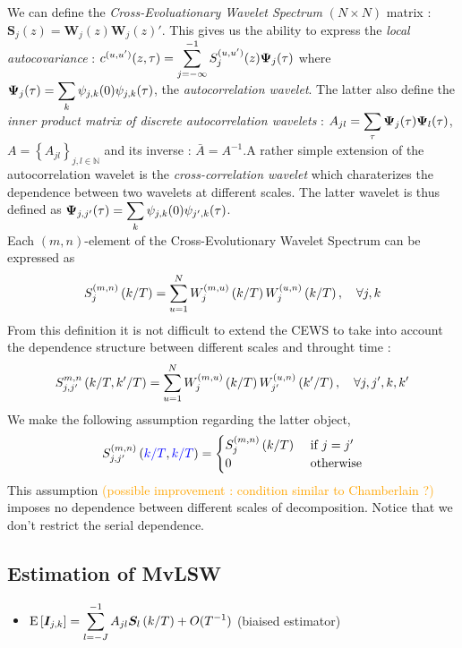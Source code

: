 \documentclass[main_document.tex]{subfiles}
\begin{document}
We can define the \emph{Cross-Evoluationary Wavelet Spectrum} $(N \times N)$ matrix : $\bm{S}_{j}(z) = \bm{W}_{j}(z)\bm{W}_{j}(z)'$.
This gives us the ability to express the \emph{local autocovariance} : $c^{(u,u')}(z,\tau) = \sum_{j=-\infty}^{-1} S_{j}^{(u,u')}(z) \ACwavelet{j}{\tau}$ where $\ACwavelet{j}{\tau} = \sum_{k} \wavelet{j}{k}{0}\wavelet{j}{k}{\tau}$, the \emph{autocorrelation wavelet}. The latter also define the \emph{inner product matrix of discrete autocorrelation wavelets} : $A_{jl} = \sum_{\tau}\ACwavelet{j}{\tau}\ACwavelet{l}{\tau}$, $A = \left\{ A_{jl}\right\}_{j,l \in \mathbb{N}}$ and its inverse : $\bar{A} = A^{-1}$.A rather simple extension of the autocorrelation wavelet is the \emph{cross-correlation wavelet} which charaterizes the dependence between two wavelets at different scales. The latter wavelet is thus defined as $\CCwavelet{j}{j'}{\tau} = \sum_{k} \wavelet{j}{k}{0}\wavelet{j'}{k}{\tau}$.\\

Each $(m,n)$-element of the Cross-Evolutionary Wavelet Spectrum can be expressed as 
\begin{align*}
	\eCEWS{m}{n}{j}{k} = \sum_{u=1}^{N} \eW{m}{u}{j}{k}\eW{u}{n}{j}{k}, \quad \forall j,k
\end{align*}
From this definition it is not difficult to extend the CEWS to take into account the dependence structure between different scales and throught time : 
\begin{align}\label{eq:serial-scale-CEWS}
	S_{j,j'}^{m,n}\left( k/T, k'/T \right) = \sum_{u=1}^{N} \eW{m}{u}{j}{k}\eW{u}{n}{j'}{k'}, \quad \forall j,j',k,k'
\end{align}
We make the following assumption regarding the latter object, 
\begin{align}\label{eq:scale-indep-spectrum}
S_{j,j'}^{(m,n)}\left( \textcolor{blue}{k/T}, \textcolor{blue}{k/T} \right) = 
	\begin{cases}
		\eCEWS{m}{n}{j}{k} & \text{ if } j=j' \\
		0 & \text{ otherwise}
	\end{cases}
\end{align}
This assumption \textcolor{orange}{(possible improvement : condition similar to Chamberlain ?)}  imposes no dependence between different scales of decomposition. Notice that we don't restrict the serial dependence. \\


\subsection{Estimation of MvLSW}
		\begin{itemize}
			\item $\E{\rawPeriodo{j}{k}} = \sum_{l=-J}^{-1} A_{jl}\CEWS{l}{k} + O(T^{-1})$ \hspace{2cm} (biaised estimator)
		\end{itemize}
\end{document}
